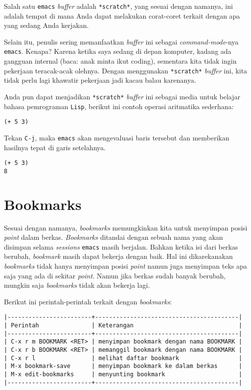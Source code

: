 \documentclass{article}
\begin{document}
Salah satu \verb=emacs= \emph{buffer} adalah \verb=*scratch*=, yang sesuai
dengan namanya, ini adalah tempat di mana Anda dapat melakukan corat-coret
terkait dengan apa yang sedang Anda kerjakan. 

Selain itu, penulis sering memanfaatkan \emph{buffer} ini sebagai 
\emph{command-mode}-nya \verb=emacs=. Kenapa? Karena ketika saya sedang di
depan komputer, kadang ada gangguan internal (baca: anak minta ikut coding),
sementara kita tidak ingin pekerjaan teracak-acak olehnya. Dengan menggunakan
\verb=*scratch*= \emph{buffer} ini, kita tidak perlu lagi khawatir pekerjaan
jadi kacau balau karenanya.

Anda pun dapat menjadikan \verb=*scratch*= \emph{buffer} ini sebagai media
untuk belajar bahasa pemrograman \verb=Lisp=, berikut ini contoh operasi
aritmatika sederhana:

\begin{verbatim}
(+ 5 3)
\end{verbatim}

Tekan \verb=C-j=, maka \verb=emacs= akan mengevaluasi baris tersebut dan 
memberikan hasilnya tepat di garis setelahnya.

\begin{verbatim}
(+ 5 3)
8
\end{verbatim}

\section{Bookmarks}
Sesuai dengan namanya, \emph{bookmarks} memungkinkan kita untuk menyimpan
posisi \emph{point} dalam berkas. \emph{Bookmarks} ditandai dengan sebuah nama
yang akan disimpan selama \emph{sessions} \verb=emacs= masih berjalan. Bahkan
ketika isi dari berkas berubah, \emph{bookmark} masih dapat bekerja dengan baik.
Hal ini dikarekanakan \emph{bookmarks} tidak hanya menyimpan posisi \emph{point}
namun juga menyimpan teks apa saja yang ada di sekitar \emph{point}. Namun jika
berkas sudah banyak berubah, mungkin saja \emph{bookmarks} tidak akan bekerja
lagi.

Berikut ini perintah-perintah terkait dengan \emph{bookmarks}:

\begin{verbatim}
|------------------------+-----------------------------------------|
| Perintah               | Keterangan                              |
|------------------------+-----------------------------------------|
| C-x r m BOOKMARK <RET> | menyimpan bookmark dengan nama BOOKMARK |
| C-x r b BOOKMARK <RET> | memanggil bookmark dengan nama BOOKMARK |
| C-x r l                | melihat daftar bookmark                 |
| M-x bookmark-save      | menyimpan bookmark ke dalam berkas      |
| M-x edit-bookmarks     | menyunting bookmark                     |
|------------------------+-----------------------------------------|
\end{verbatim}
\end{document}
